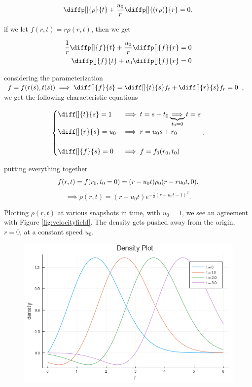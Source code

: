 \[
  \diffp[]{ \rho}{t} + \frac{u_0}{r} \diffp[]{(r\rho)}{r} = 0
.\] 

if we let $f(r,t) = r \rho(r,t)$, then we get

\begin{align*}
  \frac{1}{r} \diffp[]{f}{t} + \frac{u_0}{r} \diffp[]{f}{r} &= 0 \\
  \diffp[]{f}{t} + u_0 \diffp[]{f}{r} &= 0
\end{align*}

considering the parameterization $f = f(r(s),t(s)) \implies \diff[]{f}{s}
= \diff[]{t}{s}f_t + \diff[]{r}{s}f_{r} = 0$, we get the following
characteristic equations

\[
\begin{cases}
  \diff[]{t}{s} = 1 & \implies t = s + t_0 \underbrace{\implies}_{t_0 = 0}
  t = s \\
  \diff[]{r}{s} = u_0 & \implies r = u_0s+r_0 \\\\
  \diff[]{f}{s} = 0 & \implies f = f_0(r_0,t_0)
\end{cases}
.\] 

putting everything together
\[
  f(r,t) = f(r_0,t_0=0) = (r-u_0t) \rho_0(r-ru_0t,0) \\
.\] 
\[
  \implies \boxed{\rho(r,t) = (r-u_0t)e^{-\frac{1}{2}(r-u_0t-1)^{2}}}
.\] 

Plotting $ \rho(r,t)$ at various snapshots in time, with $u_0=1$, we see an
agreement with Figure \ref{fig:velocityfield}. The density gets pushed away
from the origin, $r=0$, at a constant speed $u_0$.

\begin{figure}[H]
  \centering
  \includegraphics[width=0.8\linewidth]{./assignment_01/figures/plot_q3.png}
  \caption{}%
  \label{fig:plot_q3}
\end{figure}

